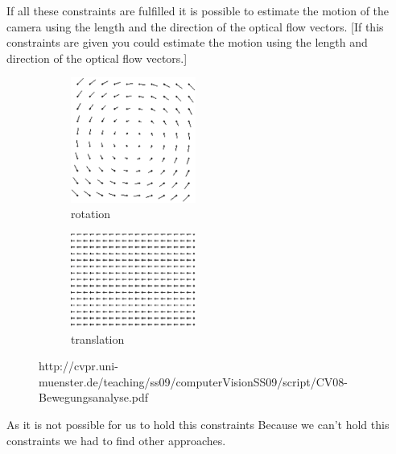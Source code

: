 \documentclass[11pt]{article}
\begin{document}
	
	If all these constraints are fulfilled it is possible to estimate the motion of the camera using the length and the direction of the optical flow vectors.
	[If this constraints are given you could estimate the motion using the length and direction of the optical flow vectors.]

	\begin{figure}[H]
	        \centering
	        \begin{subfigure}[b]{0.45\textwidth}
	                \includegraphics[width=0.45\textwidth]{images/rotation.png}
	                \caption{rotation}
	                \label{fig:FOO}
	        \end{subfigure}\hfill 
	        \begin{subfigure}[b]{0.45\textwidth}
	                \includegraphics[width=0.45\textwidth]{images/translation.png}
	                \caption{translation}
	                \label{fig:FOO}
	        \end{subfigure}
	\caption{http://cvpr.uni-muenster.de/teaching/ss09/computerVisionSS09/script/CV08-Bewegungsanalyse.pdf}

	\end{figure}

	As it is not possible for us to hold this constraints 
	Because we can’t hold this constraints we had to find other approaches.
\end{document}
